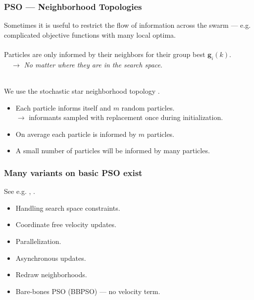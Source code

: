 \documentclass[xcolor=dvipsnames]{beamer}
\begin{document}
\begin{frame}
\frametitle{PSO --- Neighborhood Topologies}
Sometimes it is useful to restrict the flow of information across the swarm --- e.g. complicated objective functions with many local optima.\\~\\

Particles are only informed by their {\color{blue}neighbors} for their group best $\bm{g}_i(k)$.\\
\ \ $\to$ \emph{No matter where they are in the search space}. \\~\\

\pause

We use the stochastic star neighborhood topology \citep*{miranda2008stochastic}.\\
\begin{itemize}
\item Each particle informs itself and $m$ random particles.\\
$\to$ informants sampled with replacement once during initialization.
\item On average each particle is informed by $m$ particles.
\item A small number of particles will be informed by many particles.
\end{itemize}


\end{frame}

\begin{frame}
\frametitle{Many variants on basic PSO exist}
See e.g. \citet*{clerc2011spso}, \citet*[][appendix]{simpson2017adaptively}.
\begin{itemize}
\item Handling search space constraints.
\item Coordinate free velocity updates.
\item Parallelization.
\item Asynchronous updates.
\item Redraw neighborhoods.
\item Bare-bones PSO (BBPSO) --- no velocity term.
\end{itemize}
\end{frame}
\end{document}
